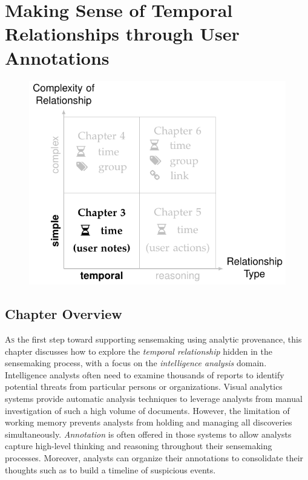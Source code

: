 \chapter{Making Sense of Temporal Relationships through User Annotations}
\label{chap:schemaline}

\graphicspath{{Chapter3/figures/}}

\vspace{.7in}

\begin{figure}[!h]
	\centering
	\includegraphics{work}
\end{figure}

\pagebreak

\section{Chapter Overview}
\lettrine{A}{s} the first step toward supporting sensemaking using analytic provenance, this chapter discusses how to explore the \emph{temporal relationship} hidden in the sensemaking process, with a focus on the \emph{intelligence analysis} domain. Intelligence analysts often need to examine thousands of reports to identify potential threats from particular persons or organizations. Visual analytics systems provide automatic analysis techniques to leverage analysts from manual investigation of such a high volume of documents. However, the limitation of working memory prevents analysts from holding and managing all discoveries simultaneously. \emph{Annotation} is often offered in those systems to allow analysts capture high-level thinking and reasoning throughout their sensemaking processes. Moreover, analysts can organize their annotations to consolidate their thoughts such as to build a timeline of suspicious events.

